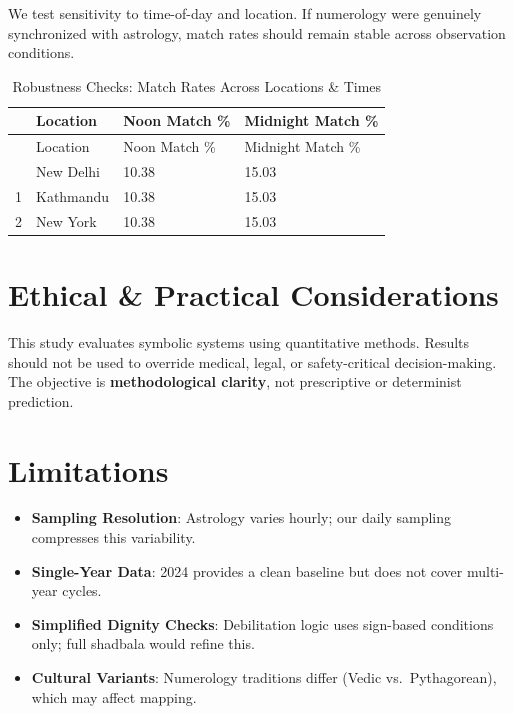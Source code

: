 \documentclass[
  american,
  11pt,
  oneside,
  openany]{article}
\providecommand{\tightlist}{%
  \setlength{\itemsep}{0pt}\setlength{\parskip}{0pt}}
\begin{document}
We test sensitivity to time-of-day and location. If numerology were
genuinely synchronized with astrology, match rates should remain stable
across observation conditions.

\label{robustness}
\begin{longtable}[]{@{}llll@{}}
\caption{Robustness Checks: Match Rates Across Locations \&
Times}\tabularnewline
\toprule\noalign{}
& Location & Noon Match \% & Midnight Match \% \\
\midrule\noalign{}
\endfirsthead
\toprule\noalign{}
& Location & Noon Match \% & Midnight Match \% \\
\midrule\noalign{}
\endhead
\bottomrule\noalign{}
\endlastfoot
0 & New Delhi & 10.38 & 15.03 \\
1 & Kathmandu & 10.38 & 15.03 \\
2 & New York & 10.38 & 15.03 \\
\end{longtable}

\section{Ethical \& Practical
Considerations}\label{ethical-practical-considerations}

This study evaluates symbolic systems using quantitative methods.
Results should not be used to override medical, legal, or
safety-critical decision-making. The objective is \textbf{methodological
clarity}, not prescriptive or determinist prediction.

\section{Limitations}\label{limitations}

\begin{itemize}
\tightlist
\item
  \textbf{Sampling Resolution}: Astrology varies hourly; our daily
  sampling compresses this variability.
\item
  \textbf{Single-Year Data}: 2024 provides a clean baseline but does not
  cover multi-year cycles.
\item
  \textbf{Simplified Dignity Checks}: Debilitation logic uses sign-based
  conditions only; full shadbala would refine this.
\item
  \textbf{Cultural Variants}: Numerology traditions differ (Vedic
  vs.~Pythagorean), which may affect mapping.
\end{itemize}
\end{document}
